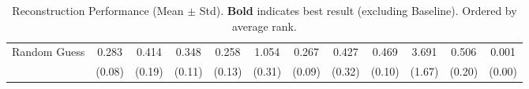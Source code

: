\begin{table}[ht]
{\begin{tabular}{l cccc cccc cc c}
            \addlinespace[0.2em]
            Random Guess                   & 0.283                                           & 0.414                                        & 0.348                                         & 0.258                   & 1.054            & 0.267          & 0.427          & 0.469          & 3.691           & 0.506          & {0.001}           \\
                                           & (0.08)                                          & (0.19)                                       & (0.11)                                        & (0.13)                  & (0.31)           & (0.09)         & (0.32)         & (0.10)         & (1.67)          & (0.20)         & (0.00)            \\
            \bottomrule
        \end{tabular}%
    }
    \caption{Reconstruction Performance (Mean $\pm$ Std). \textbf{Bold} indicates best result (excluding Baseline). Ordered by average rank.}
    \label{tab:results}

\end{table}